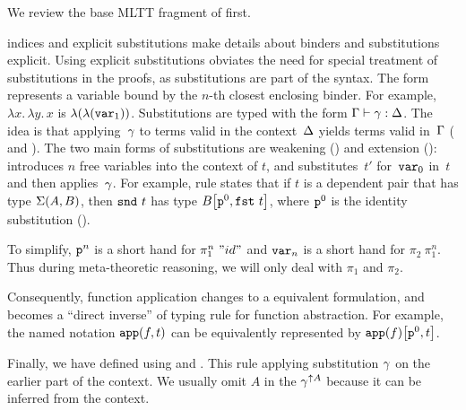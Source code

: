 We review the base MLTT fragment of \TT first.



 indices and explicit substitutions make details about
binders and substitutions explicit.
%
Using explicit substitutions obviates the need for special treatment of
substitutions in the proofs, as substitutions are part of the syntax.
%
The form  represents a variable bound by the $n$-th closest enclosing binder.
For example, $\lambda x.\,\lambda y.\,x$ is $\lambda({\lambda({\texttt{var}_{1}})})$.
%
Substitutions are typed with the form 
$ {\Gamma} \vdash {\ensuremath{\gamma}} : {\Delta} $.
The idea is that applying~$\gamma$ to terms valid in the context~$\Delta$
yields terms valid in~$\Gamma$ ( and ).
%
The two main forms of substitutions are weakening () and extension ():
 introduces $n$ free variables into the context of $t$, and
 substitutes~$t'$ for~$\texttt{var}_{0}$ in~$t$ and
then applies~$\gamma$.
For example, rule  states that if $t$ is a dependent pair
that has type $\Sigma({A},{B})$, then $\texttt{snd}~{t}$ has type
${B}\!\left[{{\texttt{p}^{0}},{\texttt{fst}~{t}}}\right]$,
where $\texttt{p}^{0}$ is the identity substitution ().

To simplify, $\texttt{p}^{n}$ is a short hand for $\pi_1^n~"id"$ and $\texttt{var}_{n}$ is a short hand for $\pi_2~\pi_1^{n}$. Thus during meta-theoretic reasoning, we will only deal with $\pi_1$ and $\pi_2$.

Consequently, function application changes to a equivalent formulation, and becomes a ``direct inverse'' of typing rule for function abstraction. For example, the named notation $\texttt{app}({f},{t})$ can be equivalently represented by ${\texttt{app}({f})}\!\left[{{\texttt{p}^{0}},{t}}\right]$.

Finally, we have  defined using  and . This rule applying substitution $\gamma$ on the earlier part of the context. We usually omit $A$ in the $\gamma^{\uparrow A}$ because it can be inferred from the context.




